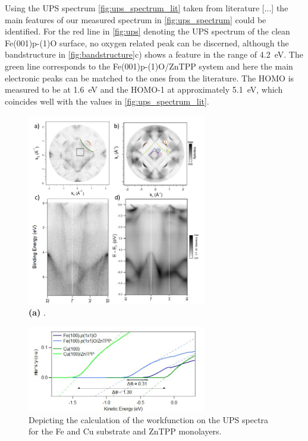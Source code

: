 \FloatBarrier
Using the UPS spectrum \autoref{fig:ups_spectrum_lit} taken from literature [...] the main features of our measured spectrum in \autoref{fig:ups_spectrum} could be identified.
For the red line in \autoref{fig:ups} denoting the UPS spectrum of the clean Fe(001)p-(1)O surface, no oxygen related peak can be discerned, although the bandstructure in \autoref{fig:bandstructure}c) shows a feature in the range of \qty{4.2}{eV}.
The green line corresponds to the Fe(001)p-(1)O/ZnTPP system and here the main electronic peaks can be matched to the ones from the literature.
The HOMO is measured to be at \qty{1.6}{eV} and the HOMO-1 at approximately \qty{5.1}{eV}, which coincides well with the values in \autoref{fig:ups_spectrum_lit}.


\begin{figure}[h]
    \centering
    \includegraphics[width = 0.7\textwidth]{Plots/bandstructure.png}
    \caption{\textbf{(a)} .}
    \label{fig:bandstructure}
\end{figure}
\FloatBarrier


\begin{figure}[h]
    \centering
    \includegraphics[width = 0.7\textwidth]{Plots/WF.png}
    \caption{Depicting the calculation of the workfunction on the UPS spectra for the Fe and Cu substrate and ZnTPP monolayers.}
    \label{fig:wf}
\end{figure}
\FloatBarrier
